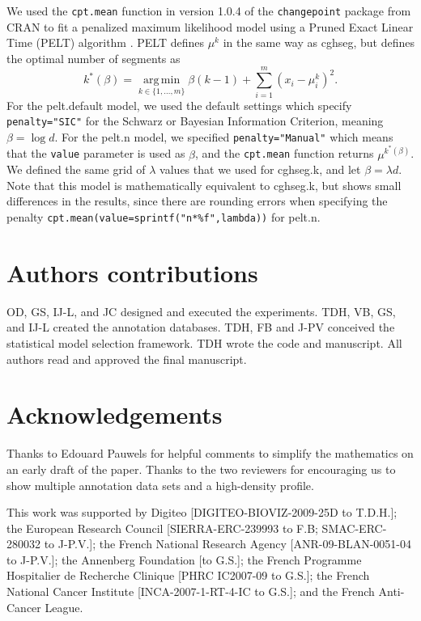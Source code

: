 \documentclass[10pt]{bmc_article}
\newcommand{\argmin}{\operatorname*{arg\, min}}
\newcommand{\model}[1]{#1}
\newcommand{\code}[1]{\texttt{#1}}
\newcommand{\package}[1]{\texttt{#1}}
\newenvironment{bmcformat}{\begin{raggedright}\baselineskip20pt\sloppy\setboolean{publ}{false}}{\end{raggedright}\baselineskip20pt\sloppy}
\begin{document}
\begin{bmcformat}
We used the \code{cpt.mean} function in version 1.0.4 of the
\package{changepoint} package from CRAN to fit a penalized maximum
likelihood model using a Pruned Exact Linear Time (PELT) algorithm
\cite{pelt}. PELT defines $\mu^k$ in the same way as cghseg, but
defines the optimal number of segments as
\begin{equation}
  \label{eq:pelt}
  k^*(\beta) = \argmin_{k\in\{1,\dots,m\}}
 \beta (k-1) + \sum_{i=1}^m (x_i-\mu_i^k)^2.
\end{equation}
For the \model{pelt.default} model, we used the default settings which
specify \code{penalty="SIC"} for the Schwarz or Bayesian Information
Criterion, meaning $\beta = \log d$. For the \model{pelt.n} model, we
specified \code{penalty="Manual"} which means that the \code{value}
parameter is used as $\beta$, and the \code{cpt.mean} function returns
$\mu^{k^*(\beta)}$. We defined the same grid of $\lambda$ values that
we used for \model{cghseg.k}, and let $\beta = \lambda d$. Note that
this model is mathematically equivalent to \model{cghseg.k}, but shows
small differences in the results, since there are rounding errors when
specifying the penalty \code{cpt.mean(value=sprintf("n*\%f",lambda))}
for \model{pelt.n}.








    
\section*{Authors contributions}
OD, GS, IJ-L, and JC designed and executed the experiments. TDH, VB,
GS, and IJ-L created the annotation databases. TDH, FB and J-PV
conceived the statistical model selection framework. TDH wrote the
code and manuscript. All authors read and approved the final
manuscript.

    

\section*{Acknowledgements}
 Thanks to Edouard Pauwels for
helpful comments to simplify the mathematics on an early draft of the
paper. Thanks to the two reviewers for encouraging us to show multiple
annotation data sets and a high-density profile.

This work was supported by Digiteo [DIGITEO-BIOVIZ-2009-25D to
T.D.H.]; the European Research Council [SIERRA-ERC-239993 to F.B; SMAC-ERC-280032 to J-P.V.];
the French National Research Agency [ANR-09-BLAN-0051-04 to J-P.V.]; the Annenberg Foundation [to G.S.];
the French Programme Hospitalier de Recherche Clinique [PHRC IC2007-09
to G.S.]; the French National Cancer Institute [INCA-2007-1-RT-4-IC to
G.S.]; and the French Anti-Cancer League.





\end{bmcformat}
\end{document}
